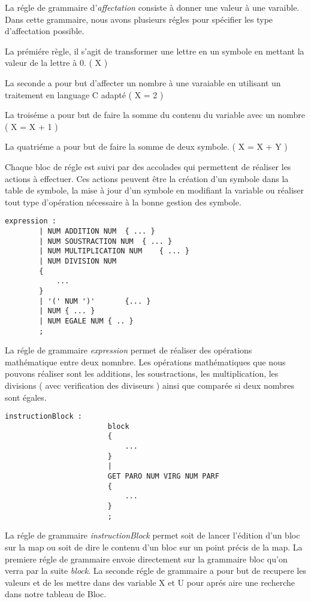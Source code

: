 La régle de grammaire d'\textit{affectation} consiste à donner une valeur à une varaible. Dans cette grammaire, nous avons plusieurs régles pour spécifier les type d'affectation possible.

La prémiére règle, il s'agit de transformer une lettre en un symbole en mettant la valeur de la lettre à 0. ( X )

La seconde a pour but d'affecter un nombre à une varaiable en utilisant un traitement en language C adapté ( X = 2 ) 

La troiséme a pour but de faire la somme du contenu du variable avec un nombre ( X = X + 1 )

La quatriéme a pour but de faire la somme de deux symbole. ( X = X + Y )

Chaque bloc de régle est suivi par des accolades qui permettent de réaliser les actions à effectuer. Ces actions peuvent être la création d'un symbole dans la table de symbole, la mise à jour d'un symbole en modifiant la variable ou réaliser tout type d'opération nécessaire à la bonne gestion des symbole.


\newpage
\lstset{style=mystyle}
\begin{lstlisting}[caption=Expression de calcul pour les nombres]
    expression : 
        | NUM ADDITION NUM	{ ... }
        | NUM SOUSTRACTION NUM	{ ... }
        | NUM MULTIPLICATION NUM	{ ... }
        | NUM DIVISION NUM	
        {
            ...
        }
        | '(' NUM ')'		{... }
        | NUM { ... }
        | NUM EGALE NUM { .. }
        ;
\end{lstlisting}

La régle de grammaire \textit{expression} permet de réaliser des opérations mathématique entre deux nomnbre.
Les opérations mathématiques que nous pouvons réaliser sont les additions, les soustractions, les multiplication, les divisions ( avec verification des diviseurs ) ainsi que comparée si deux nombres sont égales.

\lstset{style=mystyle}
\begin{lstlisting}[caption=instruction pour un Block]
    instructionBlock : 
                        block
                        {
                            ...
                        }
                        |
                        GET PARO NUM VIRG NUM PARF 
                        {
                            ...
                        }
                        ;
\end{lstlisting}

La régle de grammaire \textit{instructionBlock} permet soit de lancer l'édition d'un bloc sur la map ou soit de dire le contenu d'un bloc sur un point précis de la map.
La premiere régle de grammaire envoie directement sur la grammaire bloc qu'on verra par la suite  \textit{block}.
La seconde régle de grammaire a pour but de recupere les valeurs et de les mettre dans des variable X et U pour aprés aire une recherche dans notre tableau de Bloc.

